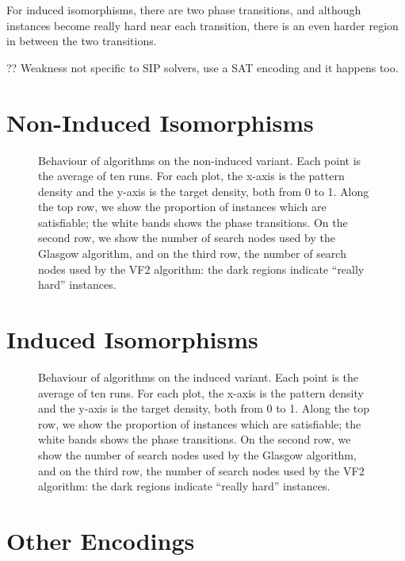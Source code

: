 \documentclass[letterpaper]{article}
\begin{document}
For induced isomorphisms, there are two phase transitions, and although instances become really hard
near each transition, there is an even harder region in between the two transitions.

?? Weakness not specific to SIP solvers, use a SAT encoding and it happens too.

\section{Non-Induced Isomorphisms}

\begin{figure*}[p]
    
    \setlength{\abovecaptionskip}{-3em}
    \caption{Behaviour of algorithms on the non-induced variant. Each point is the average of ten
        runs. For each plot, the x-axis is the pattern density and the y-axis is the target
        density, both from 0 to 1. Along the top row, we show the proportion of instances which are
        satisfiable; the white bands shows the phase transitions. On the second row, we show the
        number of search nodes used by the Glasgow algorithm, and on the third row, the number of
        search nodes used by the VF2 algorithm: the dark regions indicate ``really hard''
        instances.}
\end{figure*}

\section{Induced Isomorphisms}

\begin{figure*}[p]
    
    \setlength{\abovecaptionskip}{-3em}
    \caption{Behaviour of algorithms on the induced variant. Each point is the average of ten
        runs. For each plot, the x-axis is the pattern density and the y-axis is the target
        density, both from 0 to 1. Along the top row, we show the proportion of instances which are
        satisfiable; the white bands shows the phase transitions. On the second row, we show the
        number of search nodes used by the Glasgow algorithm, and on the third row, the number of
        search nodes used by the VF2 algorithm: the dark regions indicate ``really hard''
        instances.}
\end{figure*}

\section{Other Encodings}
\end{document}
